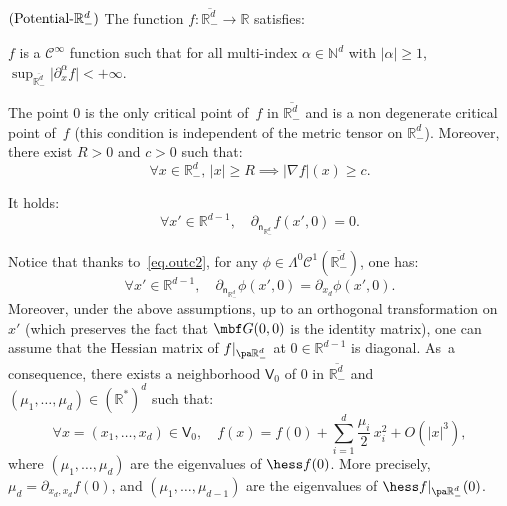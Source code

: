 \begin{manualassumption}{$(\textup{Potential-}\mathbb R^{d}_-)$}\label{PotentialRd-}
The function $f:\overline{\mathbb R^{d}_-}\to \mathbb R$ satisfies: \begin{enumeratei}
\item\label{PotentialRd-i}
$f$ is a $\mathcal C^\infty$ function such that for all multi-index $\alpha \in \mathbb N^d$ with $\vert \alpha\vert \ge 1$, $\sup_{\overline{\mathbb R^d_-}}\vert \partial_x^\alpha f\vert<+\infty$.
\item\label{PotentialRd-ii}
The point $0$ is the only critical point of~$f$ in $\overline{\mathbb R^d_-}$ and is a non degenerate critical point of~$f$ (this condition is independent of the metric tensor on $\mathbb R^{d}_-$). Moreover, there exist $R>0$ and $c>0$ such that:
\begin{equation}\label{eq.grad>0}
\forall x \in \mathbb R^d_-, \, \vert x \vert \ge R \implies \vert \nabla f\vert (x)\ge c.
\end{equation}

\item\label{PotentialRd-iii}
It holds:
\begin{equation}\label{eq.stable}
\forall x'\in \mathbb R^{d-1}, \quad \partial_{\mathsf n_{\mathbb R^d_-}}f(x',0)=0.
\end{equation}
\end{enumeratei}
\end{manualassumption}

Notice that thanks to~\eqref{eq.outc2}, for any $\phi \in
\Lambda^0\mathcal C^1(\overline{\mathbb R^d_-})$, one has:
\begin{equation}\label{eq.dec-gradient-phi}
\forall x'\in \mathbb R^{d-1},\quad \partial_{\mathsf n_{\mathbb R_-^d} }\phi (x',0)=\partial_{x_d}\phi(x',0).
\end{equation}
Moreover, under the above assumptions, up to an orthogonal transformation
on $x'$ (which preserves the fact that $\mbf G(0,0)$ is the identity matrix), one can assume that the Hessian
matrix of $f|_{\pa \mathbb R^{d}_-}$ at $0\in \mathbb R^{d-1}$ is
diagonal. As~a consequence, there exists a neighborhood $\mathsf V_0$ of $0$ in $\overline{\mathbb R^d_-}$ and $(\mu_1,\ldots,\mu_{d})\in (\mathbb R^*)^d$ such that:
\begin{equation}\label{eq.decf}
\forall x=(x_1,\ldots,x_d)\in \mathsf V_0,\quad f(x)= f(0)+
\sum_{i=1}^d \frac{\mu_i}{2}\, x_i^2 +O(|x|^3),
\end{equation}
where $(\mu_1, \ldots, \mu_d)$ are the eigenvalues of $\hess
f(0)$. More precisely, $\mu_d=\partial_{x_d,x_d} f(0)$, and
$(\mu_1,\ldots,\mu_{d-1})$ are the eigenvalues of $\hess f|_{\pa \mathbb R^{d}_-}(0)$.

